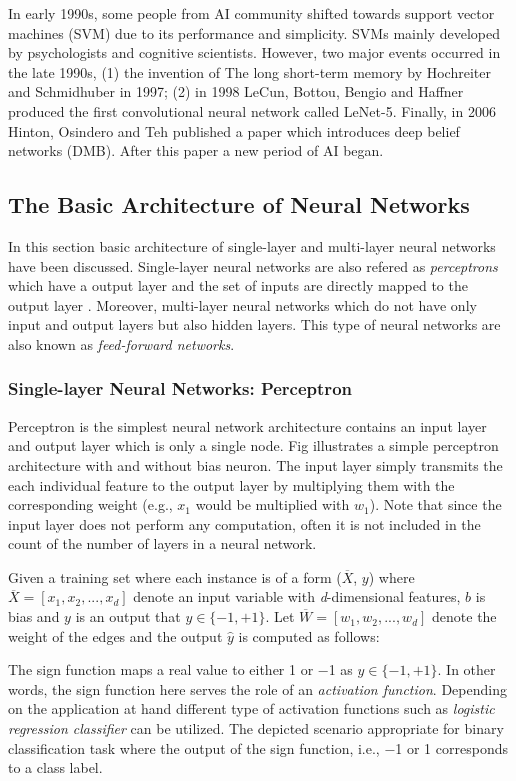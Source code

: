 In early 1990s, some people from AI community shifted towards support vector machines (SVM) due to its performance and simplicity. SVMs mainly developed by psychologists and cognitive scientists. However, two major events occurred in the late 1990s, (1) the invention of The long short-term memory by Hochreiter and Schmidhuber in 1997; (2) in 1998 LeCun, Bottou, Bengio and Haffner produced the first convolutional neural network called LeNet-5. Finally, in 2006 Hinton, Osindero and Teh published a paper which introduces deep belief networks (DMB). After this paper a new period of AI began.
\subsection{The Basic Architecture of Neural Networks} 
In this section basic architecture of single-layer and multi-layer neural networks have been discussed. Single-layer neural networks are also refered as \textit{perceptrons} which have a output layer and the set of inputs are directly mapped to the output layer%
. Moreover, multi-layer neural networks which do not have only input and output layers but also hidden layers. This type of neural networks are also known as \textit{feed-forward networks}. 
\subsubsection{Single-layer Neural Networks: Perceptron}
Perceptron is the simplest neural network architecture contains an input layer and output layer which is only a single node. Fig illustrates a simple perceptron architecture with and without bias neuron. The input layer simply transmits the each individual feature to the output layer by multiplying them with the corresponding weight (e.g., $x_1$ would be multiplied with $w_1$). Note that since the input layer does not perform any computation, often it is not included in the count of the number of layers in a neural network.

Given a training set where each instance is of a form ($\overline{X}$, $y$) where $\overline{X}=[x_1,x_2,...,x_d]$ denote an input variable with \textit{d}-dimensional features, $b$ is bias and $y$ is an output that $y \in{\{-1, +1\}}$. Let $\overline{W}=[w_1,w_2,...,w_d]$ denote the weight of the edges and the output $\hat{y}$ is computed as follows: 

The sign function maps a real value to either \num{+1} or \num{-1} as $y \in{\{-1, +1\}}$. In other words, the sign function here serves the role of an \textit{activation function}. Depending on the application at hand different type of activation functions such as \textit{logistic regression classifier} can be utilized. The depicted scenario appropriate for binary classification task where the output of the sign function, i.e., \num{-1} or \num{+1} corresponds to a class label. 


